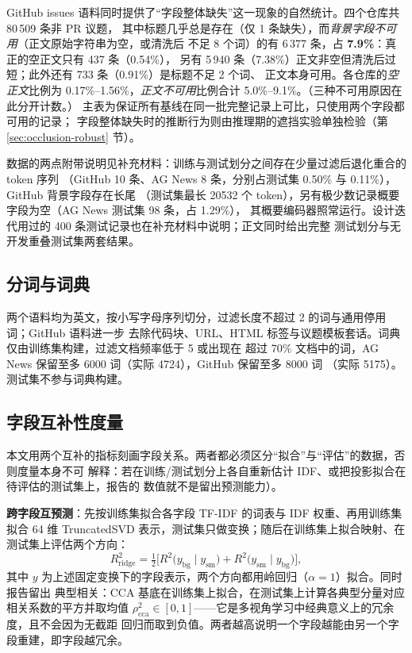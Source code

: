 \documentclass[11pt]{ctexart}
\begin{document}
GitHub issues 语料同时提供了“字段整体缺失”这一现象的自然统计。四个仓库共 80\,509 条非 PR 议题，
其中标题几乎总是存在（仅 1 条缺失），而\emph{背景字段不可用}（正文原始字符串为空，或清洗后
不足 8 个词）的有 6\,377 条，占 \textbf{7.9\%}：真正的空正文只有 437 条（0.54\%），
另有 5\,940 条（7.38\%）正文非空但清洗后过短；此外还有 733 条（0.91\%）是标题不足 2 个词、
正文本身可用。各仓库的\emph{空正文}比例为 0.17\%--1.56\%，\emph{正文不可用}比例合计
5.0\%--9.1\%。（三种不可用原因在此分开计数。）
主表为保证所有基线在同一批完整记录上可比，只使用两个字段都可用的记录；
字段整体缺失时的推断行为则由推理期的遮挡实验单独检验（第 \ref{sec:occlusion-robust} 节）。

数据的两点附带说明见补充材料：训练与测试划分之间存在少量过滤后退化重合的 token 序列
（GitHub 10 条、AG News 8 条，分别占测试集 0.50\% 与 0.11\%），GitHub 背景字段存在长尾
（测试集最长 20532 个 token），另有极少数记录概要字段为空（AG News 测试集 98 条，占 1.29\%），
其概要编码器照常运行。设计迭代用过的 400 条测试记录也在补充材料中说明；正文同时给出完整
测试划分与无开发重叠测试集两套结果。

\subsection{分词与词典}

两个语料均为英文，按小写字母序列切分，过滤长度不超过 2 的词与通用停用词；GitHub 语料进一步
去除代码块、URL、HTML 标签与议题模板套话。词典仅由训练集构建，过滤文档频率低于 5 或出现在
超过 70\% 文档中的词，AG News 保留至多 6000 词（实际 4724），GitHub 保留至多 8000 词
（实际 5175）。测试集不参与词典构建。

\subsection{字段互补性度量}

本文用两个互补的指标刻画字段关系。两者都必须区分“拟合”与“评估”的数据，否则度量本身不可
解释：若在训练/测试划分上各自重新估计 IDF、或把投影拟合在待评估的测试集上，报告的
数值就不是留出预测能力）。

\textbf{跨字段互预测}：先按训练集拟合各字段 TF-IDF 的词表与 IDF 权重、再用训练集拟合
64 维 TruncatedSVD 表示，测试集只做变换；随后在训练集上拟合映射、在测试集上评估两个方向：
\begin{equation}
R^2_{\mathrm{ridge}}=\tfrac12\Big[R^2\big(y_{\mathrm{bg}}\mid y_{\mathrm{sm}}\big)
+R^2\big(y_{\mathrm{sm}}\mid y_{\mathrm{bg}}\big)\Big],
\label{eq:cca}
\end{equation}
其中 $y$ 为上述固定变换下的字段表示，两个方向都用岭回归（$\alpha=1$）拟合。同时报告留出
典型相关：CCA 基底在训练集上拟合，在测试集上计算各典型分量对应相关系数的平方并取均值
$\rho^2_{\mathrm{cca}}\in[0,1]$——它是多视角学习中经典意义上的冗余度，且不会因为无截距
回归而取到负值。两者越高说明一个字段越能由另一个字段重建，即字段越冗余。
\end{document}

